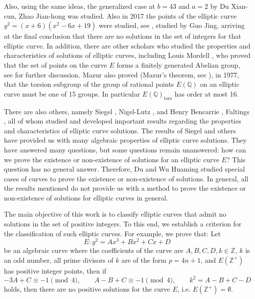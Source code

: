 \documentclass[11pt]{amsart}
\begin{document}
Also, using the same ideas, the generalized case at $b=43$ and $a=2$ by Du Xian-cun, Zhao Jian-hong \cite{ref26} was studied. Also in 2017 the points of the elliptic curve $y^2=(x+6)(x^2-6x+19)$ were studied, see \cite{ref18}, studied by Guo Jing, arriving at the final conclusion that there are no solutions in the set of integers for that elliptic curve. In addition, there are other scholars who studied the properties and characteristics of solutions of elliptic curves, including Louis Mordell \cite{ref15}, who proved that the set of points on the curve $E$ forms a finitely generated Abelian group, see \cite{ref16} for further discussion. Mazur also proved (Mazur's theorem, see \cite{ref6}), in 1977, that the torsion subgroup of the group of rational points $E(\mathbb{Q})$ on an elliptic curve must be one of 15 groups. In particular $E(\mathbb{Q})_{\mathrm{tors}}$ has order at most 16.

There are also others, namely Siegel \cite{ref11}, Nigel-Lutz \cite{ref9}, and Henry Bencarrie \cite{ref10}, Faltings \cite{ref16}, all of whom studied and developed important results regarding the properties and characteristics of elliptic curve solutions. The results of Siegel and others have provided us with many algebraic properties of elliptic curve solutions. They have answered many questions, but some questions remain unanswered: how can we prove the existence or non-existence of solutions for an elliptic curve $E$? This question has no general answer. Therefore, Du and Wu Huaming studied special cases of curves to prove the existence or non-existence of solutions. In general, all the results mentioned do not provide us with a method to prove the existence or non-existence of solutions for elliptic curves in general.

The main objective of this work is to classify elliptic curves that admit no solutions in the set of positive integers. To this end, we establish a criterion for the classification of such elliptic curves. For example, we prove that: Let
\[
E: y^2 = Ax^3 + Bx^2 + Cx + D
\]
be an algebraic curve where the coefficients of the curve are $A,B,C,D,k \in \mathbb{Z}$, $k$ is an odd number, all prime divisors of $k$ are of the form $p = 4n+1$, and $E(\mathbb{Z}^+)$ has positive integer points, then if
\[
-3A+C \equiv -1 \pmod 4, \qquad A-B+C \equiv -1 \pmod 4, \qquad k^2 = A-B+C-D
\]
holds, then there are no positive solutions for the curve $E$, i.e. $E(\mathbb{Z}^+) = \emptyset$.
\end{document}
